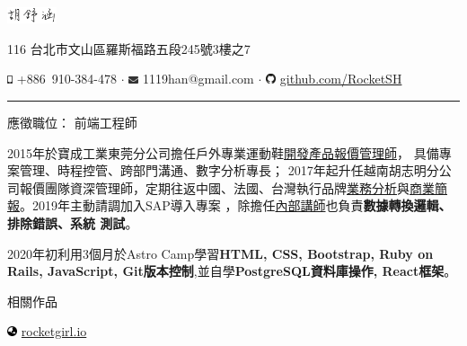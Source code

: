\documentclass[a4paper,10pt]{article}
\begin{document}
\frenchspacing

\begin{center} 
  \Huge{\includegraphics[height=1.3em,trim=0 10mm 0 -1cm]{shared/signature.png}}\par
  \normalsize {116 台北市文山區羅斯福路五段245號3樓之7}

  \includegraphics[height=0.7em]{shared/mobile-alt.eps} +886~910-384-478 $\cdot$
  \includegraphics[width=0.8em]{shared/envelope.eps} 1119han@gmail.com $\cdot$
  \includegraphics[width=0.8em]{shared/github.eps}
  \href{https://github.com/RocketSH}{github.com/RocketSH}
\end{center}

\rule{15.2cm}{0.05em}

\vspace*{1em}
\begin{center}
  \large{應徵職位： 前端工程師}
\end{center}
\vspace*{1em}

\begin{center}
  \begin{minipage}{0.9\textwidth}
        2015年於寶成工業東莞分公司擔任戶外專業運動鞋\underline{開發產品報價管理師}，
        具備專案管理、時程控管、跨部門溝通、數字分析專長；
        2017年起升任越南胡志明分公司報價團隊資深管理師，定期往返中國、法國、台灣執行品牌\underline{業務分析}與\underline{商業簡報}。2019年主動請調加入SAP導入專案
        ，除擔任\underline{內部講師}也負責\textbf{數據轉換邏輯、排除錯誤、系統
          測試}。

        \vspace*{1em}
        2020年初利用3個月於Astro Camp學習\textbf{HTML, CSS, Bootstrap, Ruby on
          Rails, JavaScript, Git版本控制},並自學\textbf{PostgreSQL資料庫操作, React框架}。
  \end{minipage}
\end{center}

\vspace*{1em}
\begin{center}
  \large{相關作品}
\end{center}
\hspace*{1em}
\includegraphics[width=0.8em]{shared/globe-asia.eps}
\href{https://rocketgirl.io/}{rocketgirl.io}
\end{document}
